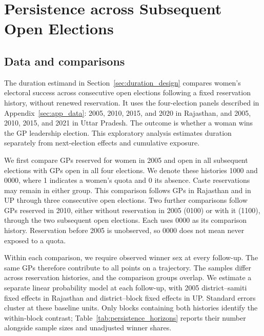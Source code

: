 \clearpage
\section{Persistence across Subsequent Open Elections}\label{sec:persistence_horizons}

\subsection{Data and comparisons}

The duration estimand in Section~\ref{sec:duration_design} compares women's electoral success across consecutive open elections following a fixed reservation history, without renewed reservation. It uses the four-election panels described in Appendix~\ref{sec:app_data}: 2005, 2010, 2015, and 2020 in Rajasthan, and 2005, 2010, 2015, and 2021 in Uttar Pradesh. The outcome is whether a woman wins the GP leadership election. This exploratory analysis estimates duration separately from next-election effects and cumulative exposure.

We first compare GPs reserved for women in 2005 and open in all subsequent elections with GPs open in all four elections. We denote these histories 1000 and 0000, where 1 indicates a women's quota and 0 its absence. Caste reservations may remain in either group. This comparison follows \persistRajFirstN{} GPs in Rajasthan and \persistUpFirstN{} in UP through three consecutive open elections. Two further comparisons follow GPs reserved in 2010, either without reservation in 2005 (0100) or with it (1100), through the two subsequent open elections. Each uses 0000 as its comparison history. Reservation before 2005 is unobserved, so 0000 does not mean never exposed to a quota.

Within each comparison, we require observed winner sex at every follow-up. The same GPs therefore contribute to all points on a trajectory. The samples differ across reservation histories, and the comparison groups overlap. We estimate a separate linear probability model at each follow-up, with 2005 district--samiti fixed effects in Rajasthan and district--block fixed effects in UP. Standard errors cluster at these baseline units. Only blocks containing both histories identify the within-block contrast; Table~\ref{tab:persistence_horizons} reports their number alongside sample sizes and unadjusted winner shares.

